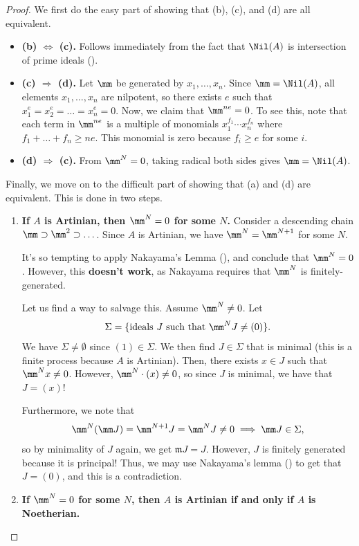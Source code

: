 \begin{proof}
    We first do the easy part of showing that (b), (c), and (d) are all equivalent.
    \begin{itemize}
    \item \textbf{(b) $\Leftrightarrow$ (c).}
    Follows immediately from the fact that 
    $\Nil(A)$ is intersection of prime ideals ().
    \item \textbf{(c) $\Rightarrow$ (d).}
    Let $\mm$ be generated by $x_1,\dots,x_n$.
    Since $\mm=\Nil(A)$, all elements $x_1,\dots,x_n$
    are nilpotent, so there exists $e$ such that
    $x_1^e = x_2^e = \dots = x_n^e = 0$.
    Now, we claim that $\mm^{ne}=0$. To see this, note that
    each term in $\mm^{ne}$ is a multiple of monomials
    $x_1^{f_1} \cdots x_n^{f_n}$ where $f_1+\dots+f_n\geq ne$.
    This monomial is zero because $f_i\geq e$ for some $i$.
    \item \textbf{(d) $\Rightarrow$ (c).}
    From $\mm^N=0$, taking radical both sides gives $\mm=\Nil(A)$.
    \end{itemize}

    Finally, we move on to the difficult part of showing that
    (a) and (d) are equivalent.
    This is done in two steps.
    \begin{enumerate}
    \item \textbf{If $A$ is Artinian,
    then $\mm^N=0$ for some $N$.}
    Consider a descending chain $\mm\supset \mm^2 \supset\dots$.
    Since $A$ is Artinian,
    we have $\mm^N = \mm^{N+1}$ for some $N$.

    It's so tempting to apply Nakayama's Lemma (),
    and conclude that $\mm^N=0$.
    However, this \textbf{doesn't work},
    as Nakayama requires that $\mm^N$ is finitely-generated.
    
    Let us find a way to salvage this.
    Assume $\mm^N\neq 0$.
    Let 
    $$\Sigma = \{\text{ideals } J\text{ such that }
    \mm^N J\neq (0)\}.$$
    We have $\Sigma\neq\emptyset$ since $(1)\in\Sigma$.
    We then find $J\in\Sigma$ that is minimal
    (this is a finite process because $A$ is Artinian).
    Then, there exists $x\in J$ such that $\mm^N x\neq 0$.
    However, $\mm^N \cdot (x)\neq 0$, so since $J$ is minimal,
    we have that $J=(x)$!
    
    Furthermore, we note that
    $$\mm^N(\mm J) = \mm^{N+1}J = \mm^N J \neq 0 
    \implies \mm J\in \Sigma,$$
    so by minimality of $J$ again, we get $\mathfrak mJ = J$.
    However, $J$ is finitely generated because it
    is principal! Thus, we may use
    Nakayama's lemma ()
    to get that $J=(0)$,
    and this is a contradiction.
    \item \textbf{If $\mm^N=0$ for some $N$,
    then $A$ is Artinian if and only if 
    $A$ is Noetherian.}


\end{enumerate}
\end{proof}

